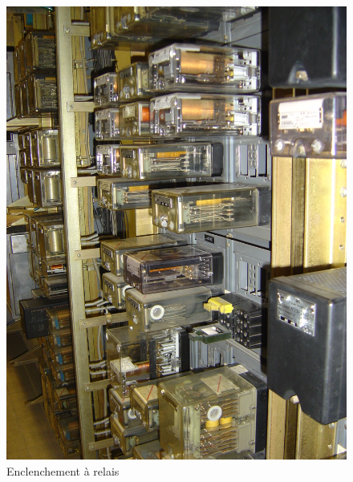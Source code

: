 \begin{figure}[ht]
\begin{minipage}[c]{.46\linewidth}
        \includegraphics[scale=0.075]{enclenchement_relais.jpg}
        \caption{Enclenchement à relais}
        \label{relais}
    \end{minipage}
\end{figure}


